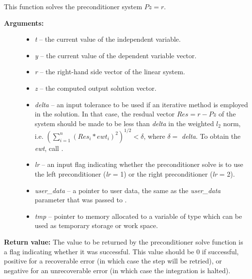 \documentclass[letterpaper,10pt,english]{sphinxmanual}
\begin{document}
\begin{fulllineitems}
\label{c_interface/User_supplied:ARKSpilsMassPrecSolveFn}
This function solves the preconditioner system $Pz=r$.
\begin{description}
\item[{\textbf{Arguments:}}] \leavevmode\begin{itemize}
\item {} 
\emph{t} -- the current value of the independent variable.

\item {} 
\emph{y} -- the current value of the dependent variable vector.

\item {} 
\emph{r} -- the right-hand side vector of the linear system.

\item {} 
\emph{z} -- the computed output solution vector.

\item {} 
\emph{delta} -- an input tolerance to be used if an iterative method
is employed in the solution.  In that case, the resdual vector
$Res = r-Pz$ of the system should be made to be less than \emph{delta}
in the weighted $l_2$ norm, i.e. $\left(\sum_{i=1}^n
\left(Res_i * ewt_i\right)^2 \right)^{1/2} < \delta$, where $\delta =$
\emph{delta}.  To obtain the  \emph{ewt}, call
{\hyperref[c_interface/User_callable:ARKodeGetErrWeights]{}}.

\item {} 
\emph{lr} -- an input flag indicating whether the preconditioner
solve is to use the left preconditioner (\emph{lr} = 1) or the right
preconditioner (\emph{lr} = 2).

\item {} 
\emph{user\_data} -- a pointer to user data, the same as the
\emph{user\_data} parameter that was passed to {\hyperref[c_interface/User_callable:ARKodeSetUserData]{}}.

\item {} 
\emph{tmp} -- pointer to memory allocated to a variable of type
 which can be used as temporary storage or work space.

\end{itemize}

\end{description}

\textbf{Return value:}
The value to be returned by the preconditioner solve
function is a flag indicating whether it was successful. This value
should be 0 if successful, positive for a recoverable error (in
which case the step will be retried), or negative for an
unrecoverable error (in which case the integration is halted).

\end{fulllineitems}
\end{document}
